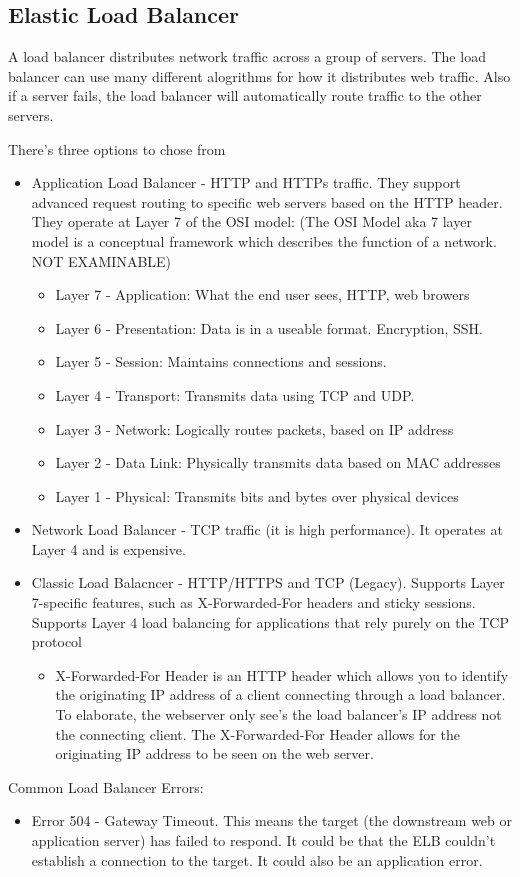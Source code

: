 \documentclass{article}%
\begin{document}
\subsection{Elastic Load Balancer}
A load balancer distributes network traffic across a group of servers. The load balancer can use many different alogrithms for how it distributes web traffic. Also if a server fails, the load balancer will automatically route traffic to the other servers.

There's three options to chose from
\begin{itemize}
    \item Application Load Balancer - HTTP and HTTPs traffic. They support advanced request routing to specific web servers based on the HTTP header. They operate at Layer 7 of the OSI model: (The OSI Model aka 7 layer model is a conceptual framework which describes the function of a network. NOT EXAMINABLE)
        \begin{itemize}
        \item Layer 7 - Application: What the end user sees, HTTP, web browers
        \item Layer 6 - Presentation: Data is in a useable format. Encryption, SSH.
        \item Layer 5 - Session: Maintains connections and sessions.
        \item Layer 4 - Transport: Transmits data using TCP and UDP.
        \item Layer 3 - Network: Logically routes packets, based on IP address
        \item Layer 2 - Data Link: Physically transmits data based on MAC addresses
        \item Layer 1 - Physical: Transmits bits and bytes over physical devices
    \end{itemize}
    \item Network Load Balancer - TCP traffic (it is high performance). It operates at Layer 4 and is expensive.
    \item Classic Load Balacncer - HTTP/HTTPS and TCP (Legacy). Supports Layer 7-specific features, such as X-Forwarded-For headers and sticky sessions. Supports Layer 4 load balancing for applications that rely purely on the TCP protocol
    \begin{itemize}
        \item X-Forwarded-For Header is an HTTP header which allows you to identify the originating IP address of a client connecting through a load balancer. To elaborate, the webserver only see's the load balancer's IP address not the connecting client. The X-Forwarded-For Header allows for the originating IP address to be seen on the web server.
    \end{itemize}
\end{itemize}
Common Load Balancer Errors:
\begin{itemize}
    \item Error 504 - Gateway Timeout. This means the target (the downstream web or application server) has failed to respond. It could be that the ELB couldn't establish a connection to the target. It could also be an application error.
\end{itemize}
\end{document}
